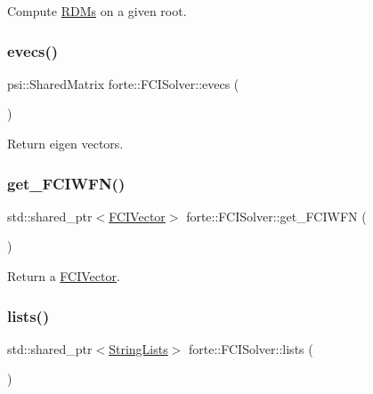 Compute \mbox{\hyperlink{classforte_1_1_r_d_ms}{R\+D\+Ms}} on a given root. 

\mbox{\label{classforte_1_1_f_c_i_solver_a4e8a59d87c2c14b3d5a2ac0c0692f8d2}} 
\subsubsection{\texorpdfstring{evecs()}{evecs()}}
{\footnotesize\ttfamily psi\+::\+Shared\+Matrix forte\+::\+F\+C\+I\+Solver\+::evecs (\begin{DoxyParamCaption}{ }\end{DoxyParamCaption})\hspace{0.3cm}{\ttfamily [inline]}}



Return eigen vectors. 

\mbox{\label{classforte_1_1_f_c_i_solver_a4c6a278c51128b2f18ada5e08512deca}} 
\subsubsection{\texorpdfstring{get\+\_\+\+F\+C\+I\+W\+F\+N()}{get\_FCIWFN()}}
{\footnotesize\ttfamily std\+::shared\+\_\+ptr$<$\mbox{\hyperlink{classforte_1_1_f_c_i_vector}{F\+C\+I\+Vector}}$>$ forte\+::\+F\+C\+I\+Solver\+::get\+\_\+\+F\+C\+I\+W\+FN (\begin{DoxyParamCaption}{ }\end{DoxyParamCaption})\hspace{0.3cm}{\ttfamily [inline]}}



Return a \mbox{\hyperlink{classforte_1_1_f_c_i_vector}{F\+C\+I\+Vector}}. 

\mbox{\label{classforte_1_1_f_c_i_solver_a2a60c41f419e985cc8a4bd454ef0441e}} 
\subsubsection{\texorpdfstring{lists()}{lists()}}
{\footnotesize\ttfamily std\+::shared\+\_\+ptr$<$\mbox{\hyperlink{classforte_1_1_string_lists}{String\+Lists}}$>$ forte\+::\+F\+C\+I\+Solver\+::lists (\begin{DoxyParamCaption}{ }\end{DoxyParamCaption})\hspace{0.3cm}{\ttfamily [inline]}}



